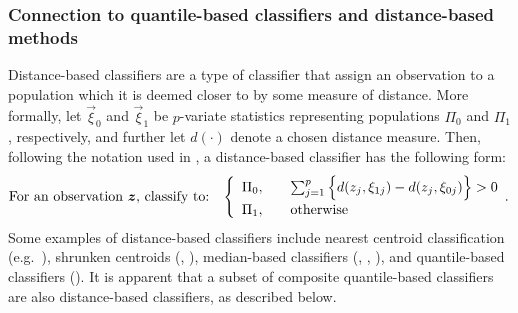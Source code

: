 


\subsubsection{Connection to quantile-based classifiers and distance-based
  methods }
\label{sec:similarities-to-existing}

Distance-based classifiers are a type of classifier that assign an observation
to a population which it is deemed closer to by some measure of distance.  More
formally, let $\vec{\xi}_0$ and $\vec{\xi}_1$ be $p$-variate statistics
representing populations $\Pi_0$ and $\Pi_1$, respectively, and further let
$d(\cdot)$ denote a chosen distance measure. Then, following the notation used
in \cite{hennig2016}, a distance-based classifier has the following form:
\begin{equation}
  \label{eq:distance-based-classifier}
  \text{For an observation $\vec{z}$, classify to:}  \hspace{3mm}
  \left\{
    \begin{array}{lll}
      \Pi_0, & & \sum_{j=1}^p
                 \Big\{
                 d(z_j, \xi_{1j}) - d(z_j, \xi_{0j})
                 \Big\} > 0 \\[1ex]
      \Pi_1, & & \text{otherwise}
    \end{array}.
  \right.
\end{equation}
Some examples of distance-based classifiers include nearest centroid
classification (e.g.\ \cite{hastie2009}), shrunken centroids
(\cite{tibshirani2002}, \cite{wang2007}), median-based classifiers
(\cite{jornsten2004}, \cite{ghosh2005}, \cite{hall2012}), and quantile-based
classifiers (\cite{hennig2016}).  It is apparent that a subset of composite
quantile-based classifiers are also distance-based classifiers, as described
below.


